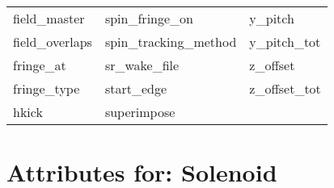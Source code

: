 \begin{tabular}{lll}
field_master                & spin_fringe_on              & y_pitch                     \\
field_overlaps              & spin_tracking_method        & y_pitch_tot                 \\
fringe_at                   & sr_wake_file                & z_offset                    \\
fringe_type                 & start_edge                  & z_offset_tot                \\
hkick                       & superimpose                 &                             \\
 \bottomrule
 \end{tabular}
 \vfill
 
 \section{Attributes for: Solenoid}
 \label{s:list.solenoid}
 
